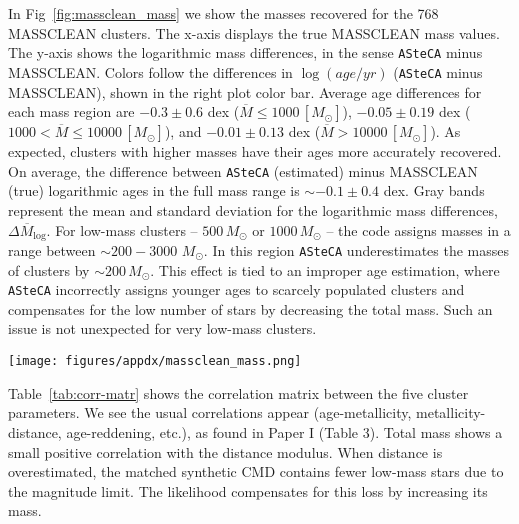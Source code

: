 \documentclass{aa}
\begin{document}
\begin{appendix}
In Fig~\ref{fig:massclean_mass} we show the masses recovered for the 768
MASSCLEAN clusters. The x-axis displays the true MASSCLEAN mass
values. The y-axis shows the logarithmic mass differences, in the sense \texttt
{ASteCA} minus MASSCLEAN.\@
%
Colors follow the differences in $\log(age/yr)$ (\texttt{ASteCA} minus
MASSCLEAN), shown in the right plot color bar.
Average age differences for each mass region are 
$-0.3{\pm}0.6$ dex ($\overline{M}{\le}1000\,[M_{\odot}]$),
$-0.05{\pm}0.19$ dex ($1000{<}\overline{M}{\le}10000\,[M_{\odot}]$), and
$-0.01{\pm}0.13$ dex ($\overline{M}{>}10000\,[M_{\odot}]$).
As expected, clusters with higher masses have their ages more accurately
recovered. On average, the difference between \texttt{ASteCA} (estimated) minus
MASSCLEAN (true) logarithmic ages in the full mass range is ${\sim}-0.1{\pm}0.4$
dex.
%
Gray bands represent the mean and standard deviation for the logarithmic
mass differences, $\overline{\Delta M_{\log}}$.
%
For low-mass clusters -- $500\,M_{\odot}$ or $1000\,M_{\odot}$ -- the
code assigns masses in a range between ${\sim}200{-}3000$ $M_{\odot}$.
In this region \texttt{ASteCA} underestimates the masses of clusters by
${\sim}200\,M_{\odot}$. This effect is tied to an improper age estimation, where
\texttt{ASteCA} incorrectly assigns younger ages to scarcely populated clusters
and compensates for the low number of stars by decreasing the total mass. Such an
issue is not unexpected for very low-mass clusters.

\begin{figure*}
\texttt{[image: figures/appdx/massclean\_mass.png]}
\caption{Recovered masses by \texttt{ASteCA} for the 768 MASSCLEAN clusters.
Logarithmic mass differences $\Delta M_{\log}$ are obtained in the sense
\texttt{ASteCA} minus MASSCLEAN and shown in the y-axis. MASSCLEAN masses in
the x-axis are perturbed with a small random scatter.}
\label{fig:massclean_mass}
\end{figure*}

Table~\ref{tab:corr-matr} shows the correlation matrix between the five cluster
parameters. We see the usual correlations appear (age-metallicity,
metallicity-distance, age-reddening, etc.), as found in Paper I (Table 3).
Total mass shows a small positive correlation with the distance modulus.
When distance is overestimated, the matched synthetic CMD contains fewer
low-mass stars due to the magnitude limit. The likelihood compensates for this
loss by increasing its mass.


\end{appendix}
\end{document}
